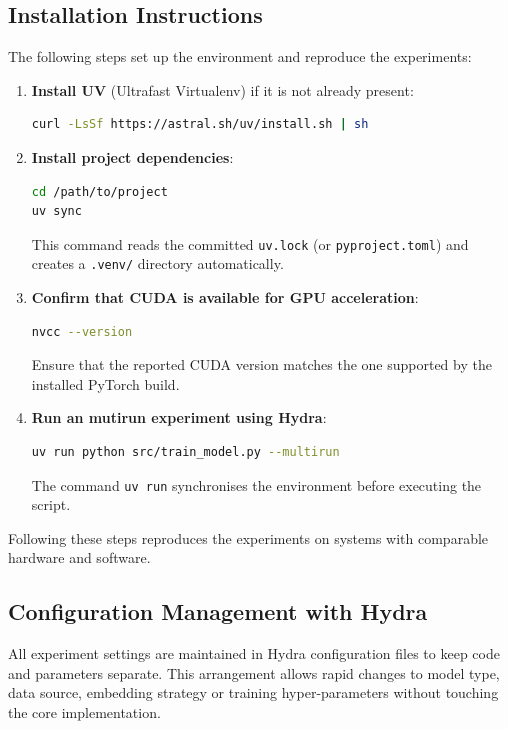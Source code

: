 \documentclass{SGGW-thesis-EN}
\begin{document}
\subsection{Installation Instructions}
The following steps set up the environment and reproduce the experiments:

\begin{enumerate}
  \item \textbf{Install UV} (Ultrafast Virtualenv) if it is not already present:
        \begin{lstlisting}[language=bash]
curl -LsSf https://astral.sh/uv/install.sh | sh
        \end{lstlisting}

  \item \textbf{Install project dependencies}:
        \begin{lstlisting}[language=bash]
cd /path/to/project
uv sync
        \end{lstlisting}
        This command reads the committed \texttt{uv.lock} (or \texttt{pyproject.toml}) and creates a
        \texttt{.venv/} directory automatically.

  \item \textbf{Confirm that CUDA is available for GPU acceleration}:
        \begin{lstlisting}[language=bash]
nvcc --version
        \end{lstlisting}
        Ensure that the reported CUDA version matches the one supported by the installed PyTorch build.

  \item \textbf{Run an mutirun experiment using Hydra}:
        \begin{lstlisting}[language=bash]
uv run python src/train_model.py --multirun
        \end{lstlisting}
        The command \texttt{uv run} synchronises the environment before executing the script.
\end{enumerate}

Following these steps reproduces the experiments on systems with comparable hardware and software.

\subsection{Configuration Management with Hydra}
All experiment settings are maintained in Hydra configuration files to keep code and parameters separate. This arrangement
allows rapid changes to model type, data source, embedding strategy or training hyper-parameters without touching the core
implementation.
\end{document}
